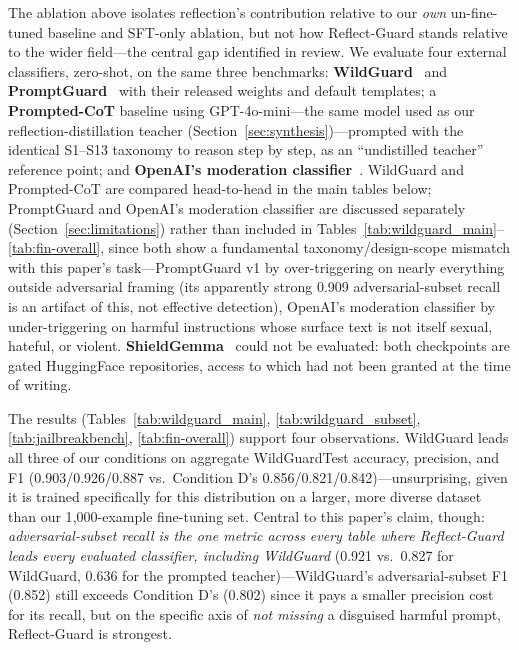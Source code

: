 \documentclass[Superintelligence,article,submit,pdftex,moreauthors]{Definitions/mdpi}
\begin{document}
The ablation above isolates reflection's contribution relative to our \emph{own} un-fine-tuned baseline and SFT-only ablation, but not how Reflect-Guard stands relative to the wider field---the central gap identified in review. We evaluate four external classifiers, zero-shot, on the same three benchmarks: \textbf{WildGuard}~\citep{han2024wildguard} and \textbf{PromptGuard}~\citep{meta2024promptguard} with their released weights and default templates; a \textbf{Prompted-CoT} baseline using GPT-4o-mini---the same model used as our reflection-distillation teacher (Section~\ref{sec:synthesis})---prompted with the identical S1--S13 taxonomy to reason step by step, as an ``undistilled teacher'' reference point; and \textbf{OpenAI's moderation classifier}~\citep{markov2023holistic}. WildGuard and Prompted-CoT are compared head-to-head in the main tables below; PromptGuard and OpenAI's moderation classifier are discussed separately (Section~\ref{sec:limitations}) rather than included in Tables~\ref{tab:wildguard_main}--\ref{tab:fin-overall}, since both show a fundamental taxonomy/design-scope mismatch with this paper's task---PromptGuard v1 by over-triggering on nearly everything outside adversarial framing (its apparently strong 0.909 adversarial-subset recall is an artifact of this, not effective detection), OpenAI's moderation classifier by under-triggering on harmful instructions whose surface text is not itself sexual, hateful, or violent. \textbf{ShieldGemma}~\citep{zeng2024shieldgemma} could not be evaluated: both checkpoints are gated HuggingFace repositories, access to which had not been granted at the time of writing.

The results (Tables~\ref{tab:wildguard_main}, \ref{tab:wildguard_subset}, \ref{tab:jailbreakbench}, \ref{tab:fin-overall}) support four observations. WildGuard leads all three of our conditions on aggregate WildGuardTest accuracy, precision, and F1 (0.903/0.926/0.887 vs.\ Condition D's 0.856/0.821/0.842)---unsurprising, given it is trained specifically for this distribution on a larger, more diverse dataset than our 1{,}000-example fine-tuning set. Central to this paper's claim, though: \emph{adversarial-subset recall is the one metric across every table where Reflect-Guard leads every evaluated classifier, including WildGuard} (0.921 vs.\ 0.827 for WildGuard, 0.636 for the prompted teacher)---WildGuard's adversarial-subset F1 (0.852) still exceeds Condition D's (0.802) since it pays a smaller precision cost for its recall, but on the specific axis of \emph{not missing} a disguised harmful prompt, Reflect-Guard is strongest.
\end{document}
